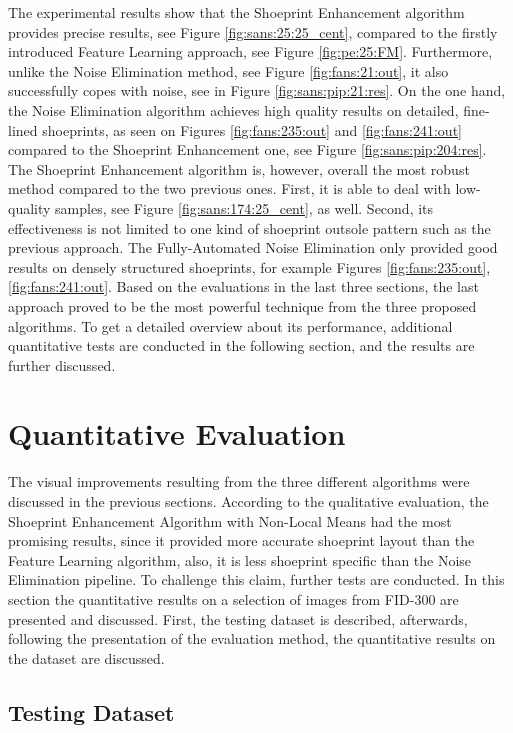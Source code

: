 \documentclass[draft,final]{vutinfth} %
\begin{document}
\par
The experimental results show that the Shoeprint Enhancement algorithm provides precise results, see Figure \ref{fig:sans:25:25_cent}, compared to the firstly introduced Feature Learning approach, see Figure \ref{fig:pe:25:FM}.
Furthermore, unlike the Noise Elimination method, see Figure \ref{fig:fans:21:out}, it also successfully copes with noise, see in Figure \ref{fig:sans:pip:21:res}.
On the one hand, the Noise Elimination algorithm achieves high quality results on detailed, fine-lined shoeprints, as seen on Figures \ref{fig:fans:235:out} and \ref{fig:fans:241:out} compared to the Shoeprint Enhancement one, see Figure \ref{fig:sans:pip:204:res}.
The Shoeprint Enhancement algorithm is, however, overall the most robust method compared to the two previous ones.
First, it is able to deal with low-quality samples, see Figure \ref{fig:sans:174:25_cent}, as well.
Second, its effectiveness is not limited to one kind of shoeprint outsole pattern such as the previous approach.
The Fully-Automated Noise Elimination only provided good results on densely structured shoeprints, for example Figures \ref{fig:fans:235:out}, \ref{fig:fans:241:out}. 
Based on the evaluations in the last three sections, the last approach proved to be the most powerful technique from the three proposed algorithms.
To get a detailed overview about its performance, additional quantitative tests are conducted in the following section, and the results are further discussed.

\section{Quantitative Evaluation}
\par
The visual improvements resulting from the three different algorithms were discussed in the previous sections.
According to the qualitative evaluation, the Shoeprint Enhancement Algorithm with Non-Local Means had the most promising results, since it provided more accurate shoeprint layout than the Feature Learning algorithm, also, it is less shoeprint specific than the Noise Elimination pipeline.
To challenge this claim, further tests are conducted.
In this section the quantitative results on a selection of images from FID-300 are presented and discussed.
First, the testing dataset is described, afterwards, following the presentation of the evaluation method, the quantitative results on the dataset are discussed.

\subsection{Testing Dataset}
\end{document}
